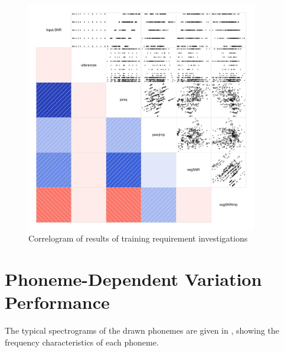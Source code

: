 \begin{figure}[h]


\noindent \begin{centering}
\includegraphics[width=0.9\textwidth]{fig/R/train/corr}
\par\end{centering}

\protect\caption{\label{fig:train-req-corr}Correlogram of results of training requirement
investigations}
\end{figure}


\clearpage{}


\section{Phoneme-Dependent Variation Performance}

The typical spectrograms of the drawn phonemes are given in ,
showing the frequency characteristics of each phoneme.

